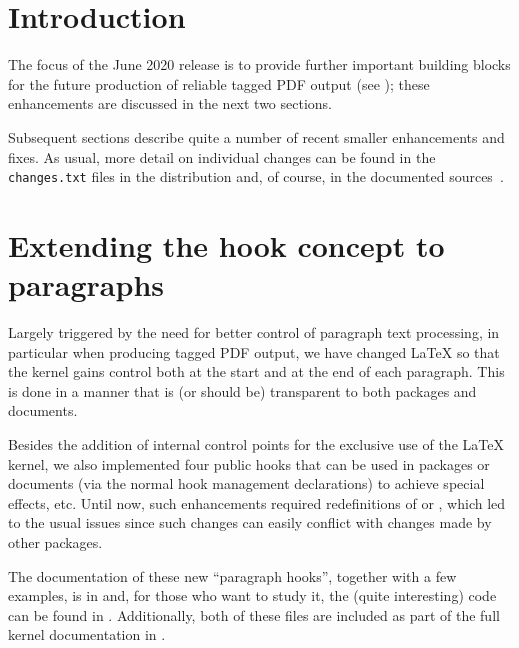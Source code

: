 \documentclass{ltnews}
\providecommand\tubcommand[1]{}
\begin{document}
\tubcommand{\addtolength\textheight{4.2pc}}   %

\maketitle
{ \spaceskip=3.33pt  \tableofcontents}

\setlength{}


\medskip


\section{Introduction}

The focus of the June 2020 release is to provide further important
building blocks for the future production of
reliable tagged PDF output
(see \cite{33:blueprint}); these enhancements
are discussed in the next two
sections. 

Subsequent sections describe quite a number of recent smaller
enhancements and fixes.  As usual, more detail on individual changes
can be found in the \texttt{changes.txt} files in the distribution
and, of course, in the documented sources~\cite{33:source2e}.



\section{Extending the hook concept to paragraphs}

Largely triggered by the need for better control of paragraph text
processing, in particular when producing tagged PDF output, we have
changed \LaTeX{} so that the kernel gains control both at the start
and at the end of each paragraph. This is done in a manner that is (or
should be) transparent to both packages and documents.

Besides the addition of internal control points for the exclusive use
of the \LaTeX{} kernel, we also implemented four public hooks that can
be used in packages or documents (via the normal hook management
declarations) to achieve special effects, etc.  Until now, such
enhancements required redefinitions of  or ,
which led to the usual issues since such changes can easily conflict
with changes made by other packages.

The documentation of these new \enquote{paragraph hooks}, together
with a few examples, is in  and, for those who
want to study it, the (quite interesting) code can be found in
. Additionally, both of these files are included
as part of the full kernel documentation in .
\end{document}
